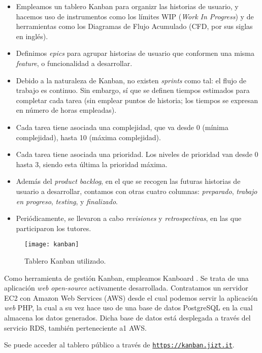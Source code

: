 \begin{itemize}
	\item [\textbullet] Empleamos un tablero Kanban para organizr las historias de usuario, y hacemos uso de instrumentos como los límites WIP (\emph{Work In Progress}) y de herramientas como los Diagramas de Flujo Acumulado (CFD, por sus siglas en inglés).
	\item [\textbullet] Definimos \emph{epics} para agrupar historias de usuario que conformen una misma \emph{feature}, o funcionalidad a desarrollar.
	\item [\textbullet] Debido a la naturaleza de Kanban, no existen \emph{sprints} como tal: el flujo de trabajo es continuo. Sin embargo, sí que se definen tiempos estimados para completar cada tarea (sin emplear puntos de historia; los tiempos se expresan en número de horas empleadas).
	\item [\textbullet] Cada tarea tiene asociada una complejidad, que va desde 0 (mínima complejidad), hasta 10 (máxima complejidad).
	\item [\textbullet] Cada tarea tiene asociada una prioridad. Los niveles de prioridad van desde 0 hasta 3, siendo esta última la prioridad máxima.
	\item [\textbullet] Además del \emph{product backlog}, en el que se recogen las futuras historias de usuario a desarrollar, contamos con otras cuatro columnas: \emph{preparado}, \emph{trabajo en progreso}, \emph{testing}, y \emph{finalizado}.
	\item [\textbullet] Periódicamente, se llevaron a cabo \emph{revisiones} y \emph{retrospectivas}, en las que participaron los tutores.
\end{itemize}

\vspace{-0.2cm}
\begin{figure}[h]
	\centering
	\texttt{[image: kanban]}
	\caption{Tablero Kanban utilizado.}
\end{figure}

Como herramienta de gestión Kanban, empleamos Kanboard \cite{kanboard}. Se trata de una aplicación \emph{web} \emph{open-source} activamente desarrollada. Contratamos un servidor EC2 con Amazon Web Services (AWS) desde el cual podemos servir la aplicación \emph{web} PHP, la cual a su vez hace uso de una base de datos PostgreSQL en la cual almacena los datos generados. Dicha base de datos está desplegada a través del servicio RDS, también perteneciente a1 AWS.

Se puede acceder al tablero público a través de \href{https://board.jizt.it/public/board/c08ea3322e2876652a0581e79d6430e2dc0c27720d8a06d7853e84c3cd2b}{\texttt{https://kanban.jizt.it}}.

